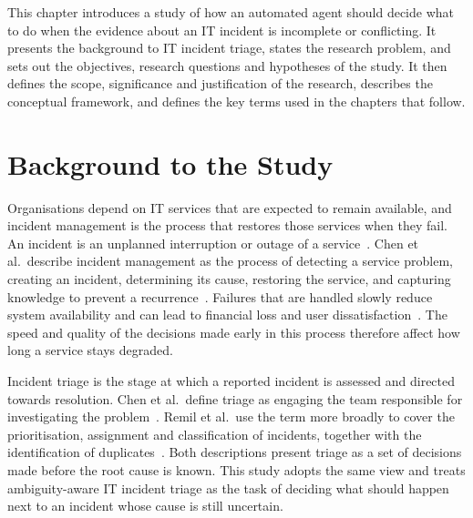 

This chapter introduces a study of how an automated agent should decide what to do when the evidence about an IT incident is incomplete or conflicting. It presents the background to IT incident triage, states the research problem, and sets out the objectives, research questions and hypotheses of the study. It then defines the scope, significance and justification of the research, describes the conceptual framework, and defines the key terms used in the chapters that follow.

\section{Background to the Study}

Organisations depend on IT services that are expected to remain available, and incident management is the process that restores those services when they fail. An incident is an unplanned interruption or outage of a service~\cite{chen2020}. Chen et al.\ describe incident management as the process of detecting a service problem, creating an incident, determining its cause, restoring the service, and capturing knowledge to prevent a recurrence~\cite{chen2020}. Failures that are handled slowly reduce system availability and can lead to financial loss and user dissatisfaction~\cite{chen2020,remil2024}. The speed and quality of the decisions made early in this process therefore affect how long a service stays degraded.

Incident triage is the stage at which a reported incident is assessed and directed towards resolution. Chen et al.\ define triage as engaging the team responsible for investigating the problem~\cite{chen2020}. Remil et al.\ use the term more broadly to cover the prioritisation, assignment and classification of incidents, together with the identification of duplicates~\cite{remil2024}. Both descriptions present triage as a set of decisions made before the root cause is known. This study adopts the same view and treats ambiguity-aware IT incident triage as the task of deciding what should happen next to an incident whose cause is still uncertain.

